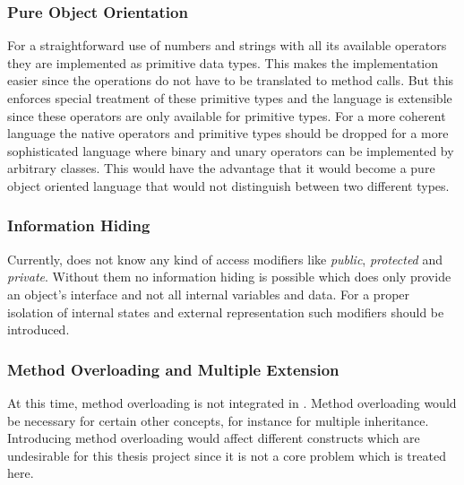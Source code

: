 \subsubsection{Pure Object Orientation}
For a straightforward use of numbers and strings with all its available
operators they are implemented as primitive data types. This makes the
implementation easier since the operations do not have to be translated
to method calls. But this enforces special treatment of these primitive types
and the language is extensible since these operators are only available for primitive
types. For a more coherent language the native operators and primitive types should
be dropped for a more sophisticated language where binary and unary operators can be
implemented by arbitrary classes. This would have the advantage that it
would become a pure object oriented language that would not distinguish
between two different types.

\subsubsection{Information Hiding}
Currently, \ooplss does not know any kind of access modifiers like
\emph{public}, \emph{protected} and \emph{private}. Without them no
information hiding is possible which does only provide an object's interface
and not all internal variables and data. For a proper isolation of
internal states and external representation such modifiers should be
introduced.

\subsubsection{Method Overloading and Multiple Extension}
At this time, method overloading is not integrated in \ooplss. Method
overloading would be necessary for certain other concepts, for instance
for multiple inheritance. Introducing method overloading would affect
different constructs which are undesirable for this thesis project since
it is not a core problem which is treated here.


